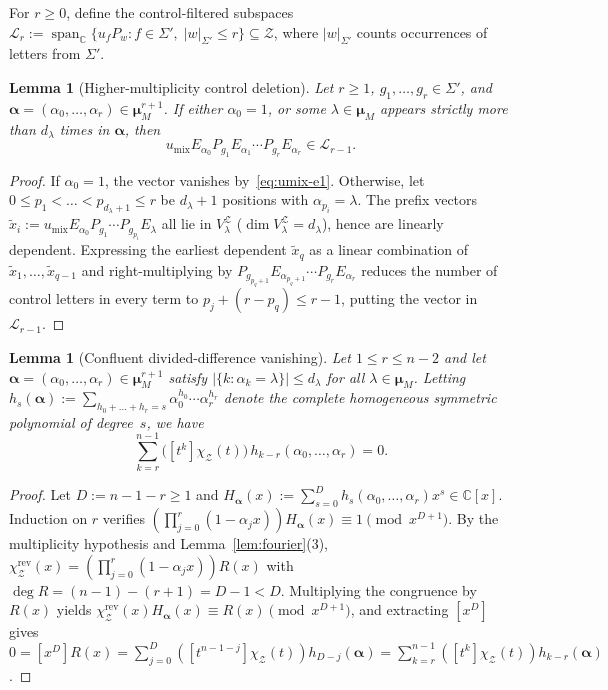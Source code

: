 \documentclass[11pt,a4paper]{article}
\newtheorem{lemma}[theorem]{Lemma}
\theoremstyle{definition}
\theoremstyle{remark}
\newcommand{\C}{\mathbb{C}}
\newcommand{\cL}{\mathcal{L}}
\newcommand{\cZ}{\mathcal{Z}}
\newcommand{\bmu}{\boldsymbol{\mu}}
\begin{document}
For $r \ge 0$, define the control-filtered subspaces $\cL_r := \operatorname{span}_\C\{u_f P_w : f \in \Sigma',\; |w|_{\Sigma'} \le r\} \subseteq \cZ$, where $|w|_{\Sigma'}$ counts occurrences of letters from $\Sigma'$.

\begin{lemma}[Higher-multiplicity control deletion]
\label{lem:hm-del}
Let $r \ge 1$, $g_1, \dots, g_r \in \Sigma'$, and $\boldsymbol{\alpha} = (\alpha_0, \dots, \alpha_r) \in \bmu_M^{r+1}$. If either $\alpha_0 = 1$, or some $\lambda \in \bmu_M$ appears strictly more than $d_\lambda$ times in $\boldsymbol{\alpha}$, then
\[
  u_{\mathrm{mix}} E_{\alpha_0} P_{g_1} E_{\alpha_1} \cdots P_{g_r} E_{\alpha_r} \in \cL_{r-1}.
\]
\end{lemma}
\begin{proof}
If $\alpha_0 = 1$, the vector vanishes by~\eqref{eq:umix-e1}. Otherwise, let $0 \le p_1 < \dots < p_{d_\lambda + 1} \le r$ be $d_\lambda + 1$ positions with $\alpha_{p_i} = \lambda$. The prefix vectors $\widetilde{x}_i := u_{\mathrm{mix}} E_{\alpha_0} P_{g_1} \cdots P_{g_{p_i}} E_\lambda$ all lie in $V_\lambda^\cZ$ ($\dim V_\lambda^\cZ = d_\lambda$), hence are linearly dependent. Expressing the earliest dependent $\widetilde{x}_q$ as a linear combination of $\widetilde{x}_1, \dots, \widetilde{x}_{q-1}$ and right-multiplying by $P_{g_{p_q+1}} E_{\alpha_{p_q+1}} \cdots P_{g_r} E_{\alpha_r}$ reduces the number of control letters in every term to $p_j + (r - p_q) \le r - 1$, putting the vector in $\cL_{r-1}$.
\end{proof}

\begin{lemma}[Confluent divided-difference vanishing]
\label{lem:divdiff}
Let $1 \le r \le n - 2$ and let $\boldsymbol{\alpha} = (\alpha_0, \dots, \alpha_r) \in \bmu_M^{r+1}$ satisfy $|\{k : \alpha_k = \lambda\}| \le d_\lambda$ for all $\lambda \in \bmu_M$. Letting $h_s(\boldsymbol{\alpha}) := \sum_{h_0 + \dots + h_r = s} \alpha_0^{h_0} \cdots \alpha_r^{h_r}$ denote the complete homogeneous symmetric polynomial of degree~$s$, we have
\[
  \sum_{k = r}^{n - 1} \bigl([t^k]\chi_\cZ(t)\bigr)\, h_{k - r}(\alpha_0, \dots, \alpha_r) = 0.
\]
\end{lemma}
\begin{proof}
Let $D := n - 1 - r \ge 1$ and $H_{\boldsymbol{\alpha}}(x) := \sum_{s=0}^D h_s(\alpha_0, \dots, \alpha_r) x^s \in \C[x]$. Induction on $r$ verifies $(\prod_{j=0}^r (1 - \alpha_j x)) H_{\boldsymbol{\alpha}}(x) \equiv 1 \pmod{x^{D+1}}$. By the multiplicity hypothesis and Lemma~\ref{lem:fourier}(3), $\chi_\cZ^{\mathrm{rev}}(x) = (\prod_{j=0}^r (1 - \alpha_j x)) R(x)$ with $\deg R = (n-1) - (r+1) = D - 1 < D$. Multiplying the congruence by $R(x)$ yields $\chi_\cZ^{\mathrm{rev}}(x) H_{\boldsymbol{\alpha}}(x) \equiv R(x) \pmod{x^{D+1}}$, and extracting $[x^D]$ gives $0 = [x^D]R(x) = \sum_{j=0}^D ([t^{n-1-j}]\chi_\cZ(t)) h_{D-j}(\boldsymbol{\alpha}) = \sum_{k=r}^{n-1} ([t^k]\chi_\cZ(t)) h_{k-r}(\boldsymbol{\alpha})$.
\end{proof}
\end{document}
